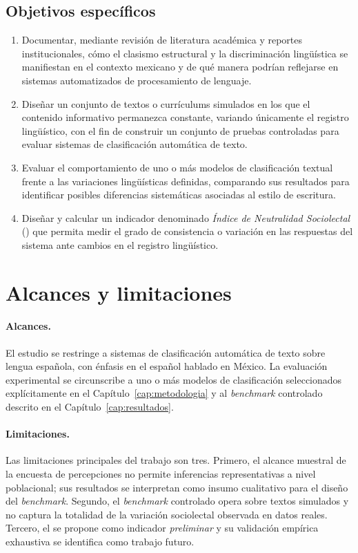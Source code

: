 \subsection*{Objetivos específicos}

\begin{enumerate}[label=\textbf{O\arabic*.},leftmargin=2.2em]
  \item Documentar, mediante revisión de literatura académica y reportes
    institucionales, cómo el clasismo estructural y la discriminación
    lingüística se manifiestan en el contexto mexicano y de qué manera podrían
    reflejarse en sistemas automatizados de procesamiento de lenguaje.
  \item Diseñar un conjunto de textos o currículums simulados en los que el
    contenido informativo permanezca constante, variando únicamente el
    registro lingüístico, con el fin de construir un conjunto de pruebas
    controladas para evaluar sistemas de clasificación automática de texto.
  \item Evaluar el comportamiento de uno o más modelos de clasificación
    textual frente a las variaciones lingüísticas definidas, comparando sus
    resultados para identificar posibles diferencias sistemáticas asociadas
    al estilo de escritura.
  \item Diseñar y calcular un indicador denominado \emph{Índice de Neutralidad
    Sociolectal} (\INS) que permita medir el grado de consistencia o variación
    en las respuestas del sistema ante cambios en el registro lingüístico.
\end{enumerate}

\section{Alcances y limitaciones}
\label{sec:alcances}

\paragraph{Alcances.} El estudio se restringe a sistemas de clasificación
automática de texto sobre lengua española, con énfasis en el español hablado
en México. La evaluación experimental se circunscribe a uno o más modelos de
clasificación seleccionados explícitamente en el Capítulo~\ref{cap:metodologia}
y al \emph{benchmark} controlado descrito en el Capítulo~\ref{cap:resultados}.

\paragraph{Limitaciones.} Las limitaciones principales del trabajo son tres.
Primero, el alcance muestral de la encuesta de percepciones no permite
inferencias representativas a nivel poblacional; sus resultados se interpretan
como insumo cualitativo para el diseño del \emph{benchmark}. Segundo, el
\emph{benchmark} controlado opera sobre textos simulados y no captura la
totalidad de la variación sociolectal observada en datos reales. Tercero, el
\INS se propone como indicador \emph{preliminar} y su validación empírica
exhaustiva se identifica como trabajo futuro.

